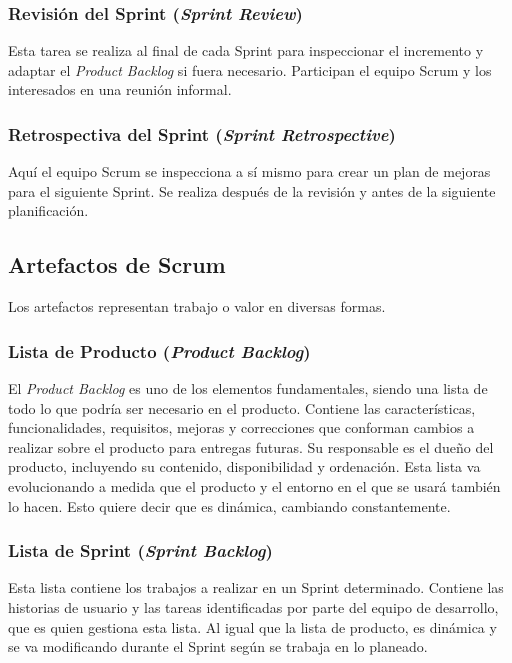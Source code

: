 \subsubsection{Revisión del Sprint (\textit{Sprint Review})}
Esta tarea se realiza al final de cada Sprint para inspeccionar el incremento y adaptar el \textit{Product Backlog} si fuera necesario. Participan el equipo Scrum y los interesados en una reunión informal.

\subsubsection{Retrospectiva del Sprint (\textit{Sprint Retrospective})}
Aquí el equipo Scrum se inspecciona a sí mismo para crear un plan de mejoras para el siguiente Sprint. Se realiza después de la revisión y antes de la siguiente planificación.

\newpage

\subsection{Artefactos de Scrum}
Los artefactos \cite{Schwaber2017} representan trabajo o valor en diversas formas.

\subsubsection{Lista de Producto (\textit{Product Backlog})}
El \textit{Product Backlog} es uno de los elementos fundamentales, siendo una lista de todo lo que podría ser necesario en el producto. Contiene las características, funcionalidades, requisitos, mejoras y correcciones que conforman cambios a realizar sobre el producto para entregas futuras. Su responsable es el dueño del producto, incluyendo su contenido, disponibilidad y ordenación. Esta lista va evolucionando a medida que el producto y el entorno en el que se usará también lo hacen. Esto quiere decir que es dinámica, cambiando constantemente.

\subsubsection{Lista de Sprint (\textit{Sprint Backlog})}
Esta lista \cite{Gomez2017} contiene los trabajos a realizar en un Sprint determinado. Contiene las historias de usuario y las tareas identificadas por parte del equipo de desarrollo, que es quien gestiona esta lista. Al igual que la lista de producto, es dinámica y se va modificando durante el Sprint según se trabaja en lo planeado.

